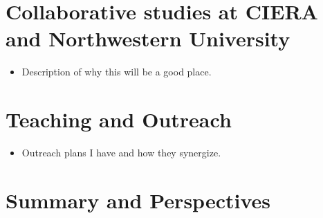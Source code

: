 \documentclass[aasms,12pt]{article}
\begin{document}
\section{Collaborative studies at CIERA and Northwestern University}
\label{sct:northwestern}

\begin{itemize}
\item Description of why this will be a good place.
\end{itemize}


\section{Teaching and Outreach}
\label{sct:outreach}

\begin{itemize}
\item Outreach plans I have and how they synergize.
\end{itemize}


\section{Summary and Perspectives}
\label{sct:summary}
\end{document}
